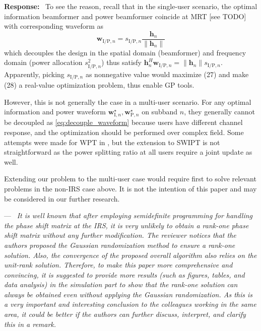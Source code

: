 \documentclass{article}
\newcounter{reviewer}
\newcounter{point}[reviewer]
\renewcommand{\thepoint}
	{\thereviewer.\arabic{point}}
\newenvironment{point}
	{\refstepcounter{point} \bigskip \noindent {\textbf{Comment~\thepoint} } ---\ \itshape}
	{\par}
\newenvironment{response}
	{\medskip \noindent \textbf{Response:}\ }
	{\medskip}
\begin{document}
\begin{reviewersection}
\begin{response}
			To see the reason, recall that in the single-user scenario, the optimal information beamformer and power beamformer coincide at MRT [see TODO] with corresponding waveform as
			\begin{equation}
				\boldsymbol{w}_{\mathrm{I/P}, n} = s_{\mathrm{I/P}, n} \frac{\boldsymbol{h}_{n}}{\lVert{\boldsymbol{h}_{n}}\rVert}
				\label{eq:decouple_waveform}
			\end{equation}
			which decouples the design in the spatial domain (beamformer) and frequency domain (power allocation $s_{\mathrm{I/P},n}^2$) thus satisfy $\boldsymbol{h}_n^H\boldsymbol{w}_{\mathrm{I/P},n}=\lVert{\boldsymbol{h}_n}\rVert s_{\mathrm{I/P},n}$. Apparently, picking $s_{\mathrm{I/P}, n}$ as nonnegative value would maximize (27) and make (28) a real-value optimization problem, thus enable GP tools.

			However, this is not generally the case in a multi-user scenario. For any optimal information and power waveform $\boldsymbol{w}_{\mathrm{I}, n}^{\star}, \boldsymbol{w}_{\mathrm{P}, n}^{\star}$ on subband $n$, they generally cannot be decoupled as \eqref{eq:decouple_waveform} because users have different channel response, and the optimization should be performed over complex field. Some attempts were made for WPT in \cite{Huang2017a}, but the extension to SWIPT is not straightforward as the power splitting ratio at all users require a joint update as well.

			Extending our problem to the multi-user case would require first to solve relevant problems in the non-IRS case above. It is not the intention of this paper and may be considered in our further research.
		\end{response}

		\begin{point}
			It is well known that after employing semidefinite programming for handling the phase shift matrix at the IRS, it is very unlikely to obtain a rank-one phase shift matrix without any further modification. The reviewer notices that the authors proposed the Gaussian randomization method to ensure a rank-one solution. Also, the convergence of the proposed overall algorithm also relies on the unit-rank solution. Therefore, to make this paper more comprehensive and convincing, it is suggested to provide more results (such as figures, tables, and data analysis) in the simulation part to show that the rank-one solution can always be obtained even without applying the Gaussian randomization. As this is a very important and interesting conclusion to the colleagues working in the same area, it could be better if the authors can further discuss, interpret, and clarify this in a remark.
		\end{point}


\end{reviewersection}
\end{document}

